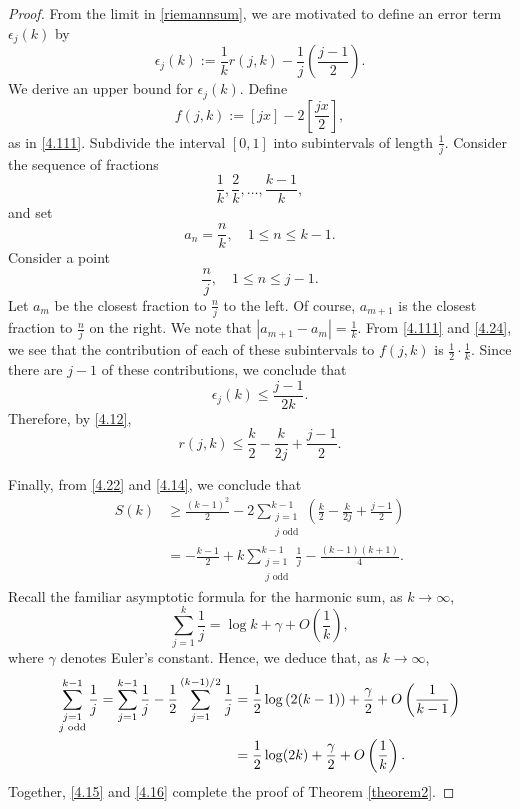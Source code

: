 \documentclass[10pt,a4paper]{amsart}
\newcommand{\df}{\dfrac}
\begin{document}
\begin{proof}
From the limit in \eqref{riemannsum}, we are motivated to define an error term $\epsilon_j(k)$ by
\begin{equation}\label{4.12}
\epsilon_j(k):= \frac{1}{k} r(j,k) -\frac{1}{j}\left(\frac{j-1}{2}\right).
\end{equation}
 We derive an upper bound for $\epsilon_j(k).$  Define
 \begin{equation}\label{4.24}
  f(j,k):=[ jx]-2\left[\frac{jx}{2}\right],
  \end{equation}
  as in \eqref{4.111}.  Subdivide the interval $[0,1]$ into subintervals of length $\frac{1}{j}.$ Consider the sequence of fractions
 $$\frac{1}{k},\frac{2}{k},\dots,\frac{k-1}{k},$$
 and set
 $$a_n=\frac{n}{k},\quad 1\leq n \leq k-1.$$
 Consider a point
 $$\frac{n}{j}, \quad 1\leq n \leq j-1.$$
   Let $a_m$ be the closest fraction to $\frac{n}{j}$ to the left. Of course, $a_{m+1}$ is the closest fraction to $\frac{n}{j}$ on the right.  We note that $|a_{m+1}-a_m|=\frac{1}{k}$.  From \eqref{4.111} and \eqref{4.24}, we see that the contribution of each of these subintervals to $f(j,k)$ is $\frac12\cdot\frac{1}{k}$. Since there are $j-1$ of these contributions, we conclude that
 $$ \epsilon_j(k)\leq \dfrac{j-1}{2k}.$$
 Therefore, by \eqref{4.12},
 \begin{equation}\label{4.14}
 r(j,k)\leq \frac{k}{2}-\frac{k}{2j}+\frac{j-1}{2} .
\end{equation}

Finally, from \eqref{4.22} and \eqref{4.14}, we conclude that
\begin{align}\label{4.15}
	S(k)
	&\geq \frac{(k-1)^2}{2}-2\sum_{\substack{j=1\\j\text{ odd}}}^{k-1}\left(\frac{k}{2}-\frac{k}{2j}+\frac{j-1}{2}\right) \nonumber\\
 &=-\frac{k-1}{2}+k\sum_{\substack{j=1 \\j \text{ odd}}}^{k-1}\frac{1}{j}-\frac{(k-1)(k+1)}{4}.
\end{align}
Recall the familiar asymptotic formula for the harmonic sum, as $k\to\infty$,
$$ \sum_{j=1}^k\df{1}{j} = \log k +\gamma +O\left(\df{1}{k}\right), $$
where $\gamma$ denotes Euler's constant.  Hence, we deduce that, as $k\to\infty$,
\begin{align}\label{4.16}
\sum_{\substack{j=1\\j\text{ odd}}}^{k-1}\df{1}{j}= \sum_{j=1}^{k-1}\df{1}{j}- \df{1}{2}\sum_{j=1}^{(k-1)/2}\df{1}{j}=&\;\frac{1}{2}\log\left(2(k-1)\right)+\frac{\gamma}{2}+O\left(\frac{1}{k-1}\right)\notag\\
=&\;\frac{1}{2}\log(2k)+\frac{\gamma}{2}+O\left(\frac{1}{k}\right).
\end{align}
Together, \eqref{4.15} and \eqref{4.16} complete the proof of Theorem \ref{theorem2}.
\end{proof}
\end{document}

